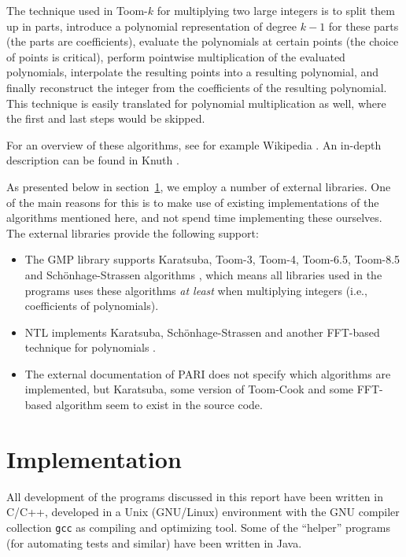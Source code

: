 \documentclass{cslthse-msc}
\newcommand{\code}{\texttt}
\begin{document}
The technique used in Toom-$k$ for multiplying two large integers is to split them up in parts, introduce a polynomial representation of degree $k-1$ for these parts (the parts are coefficients), evaluate the polynomials at certain points (the choice of points is critical), perform pointwise multiplication of the evaluated polynomials, interpolate the resulting points into a resulting polynomial, and finally reconstruct the integer from the coefficients of the resulting polynomial. This technique is easily translated for polynomial multiplication as well, where the first and last steps would be skipped.

For an overview of these algorithms, see for example Wikipedia \cite{strass} \cite{toom-cook}. An in-depth description can be found in Knuth \cite[sec. 4.3.3]{knuth2}.

As presented below in section~\ref{implementation}, we employ a number of external libraries. One of the main reasons for this is to make use of existing implementations of the algorithms mentioned here, and not spend time implementing these ourselves. The external libraries provide the following support:

\begin{itemize}
 \item The GMP library supports Karatsuba, Toom-3, Toom-4, Toom-6.5, Toom-8.5 and Schönhage-Strassen algorithms \cite[p. 90]{gmp}, which means all libraries used in the programs uses these algorithms \emph{at least} when multiplying integers (i.e., coefficients of polynomials).
 \item NTL implements Karatsuba, Schönhage-Strassen and another FFT-based technique for polynomials \cite{ntl_zzx}.
 \item The external documentation of PARI does not specify which algorithms are implemented, but Karatsuba, some version of Toom-Cook and some FFT-based algorithm seem to exist in the source code.
\end{itemize}

\section{Implementation}\label{implementation}
All development of the programs discussed in this report have been written in C/C++, developed in a Unix (GNU/Linux) environment with the GNU compiler collection \code{gcc} as compiling and optimizing tool. Some of the ``helper'' programs (for automating tests and similar) have been written in Java.
\end{document}
